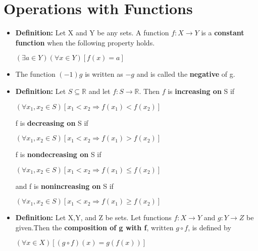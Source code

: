 \documentclass{report}
\begin{document}
	\section{Operations with Functions}
		\begin{itemize}\addtolength{\leftskip}{2em}
			\item \textbf{Definition:} Let X and Y be any sets. A function $f:X\rightarrow Y$ is a \textbf{constant function} when the following property holds.
			\begin{center}
			$(\exists a\in Y)(\forall x\in Y)[f(x)=a]$
			\end{center}
			\item The function $(-1)g$ is written as $-g$ and is called the \textbf{negative} of g.
			\item \textbf{Definition:} Let $S\subseteq\mathbb{R}$ and let $f:S\rightarrow\mathbb{R}$. Then $f$ is \textbf{increasing on} S if 
			\begin{center}
			$(\forall x_1,x_2\in S)[x_1<x_2\Rightarrow f(x_1)<f(x_2)]$
			\end{center}
			f is \textbf{decreasing on} S if
			\begin{center}
			$(\forall x_1,x_2\in S)[x_1<x_2\Rightarrow f(x_1)>f(x_2)]$
			\end{center}
			f is \textbf{nondecreasing on} S if
			\begin{center}
			$(\forall x_1,x_2\in S)[x_1<x_2\Rightarrow f(x_1)\le f(x_2)]$
			\end{center}
			and f is \textbf{nonincreasing on} S if
			\begin{center}
			$(\forall x_1,x_2\in S)[x_1<x_2\Rightarrow f(x_1)\ge f(x_2)]$
			\end{center}
			\item \textbf{Definition:} Let X,Y, and Z be sets. Let functions $f:X\rightarrow Y$ and $g:Y\rightarrow Z$ be given.\newline Then the \textbf{composition of g with f}, written $g\circ f$, is defined by
			\begin{center}
			$(\forall x\in X)[(g\circ f)(x)=g(f(x))]$
			\end{center}
		\end{itemize}
\end{document}
